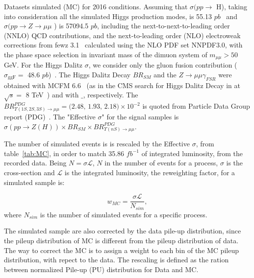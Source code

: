 \begin{table}[htp]
\begin{center}
\caption{Datasets simulated (MC) for 2016 conditions. Assuming that $\sigma (pp\rightarrow$ H), taking into consideration all the simulated Higgs production modes, is 55.13 $pb$~\cite{CERNYellowReportPageAt13TeV} and  $\sigma (pp\rightarrow Z \rightarrow \mu\mu$ ) is 57094.5 $pb$, including the next-to-next-to-leading order
(NNLO) QCD contributions, and the next-to-leading order (NLO) electroweak corrections from fewz 3.1~\cite{FEWZ} calculated using the NLO PDF set NNPDF3.0, with the phase space selection in invariant mass of the dimuon system of $m_{\mu\mu} > 50$ GeV. For the Higgs Dalitz $\sigma$, we consider only the gluon fusion contribution ($\sigma_{\text{ggF}}  = $ 48.6 $pb$)~\cite{CERNYellowReportPageAt13TeV}. The Higgs Dalitz Decay $BR_{SM}$ and the $Z \rightarrow \mu\mu\gamma_{FSR}$ were obtained with MCFM 6.6~\cite{CAMPBELL201010} (as in the CMS search for Higgs Dalitz Decay in at $\sqrt{s} =$ 8 TeV~\cite{dalitz_decay_8_Tev}) and with  $\_$\MCATNLO, respectively. The $BR^{PDG}_{\Upsilon(1S,2S,3S) \rightarrow \mu\mu} = \text{(2.48, 1.93, 2.18)} \times 10^{-2}$ is quoted from Particle Data Group report (PDG)~\cite{pdg_2020}. The "Effective $\sigma$" for the signal samples is $\sigma(pp \rightarrow Z(H)) \times BR_{SM} \times BR^{PDG}_{\Upsilon(nS) \rightarrow \mu\mu}$.}

\label{tab:MC}
\end{center}
\end{table}

The number of simulated events is is rescaled by the Effective $\sigma$, from table~\ref{tab:MC}, in order to match 35.86 $fb^{-1}$ of integrated luminosity, from the recorded data. Being $N = \sigma \mathcal{L}$, $N$ in the number of events for a process, $\sigma$ is the cross-section and $\mathcal{L}$ is the integrated luminosity, the reweighting factor, for a simulated sample is:

\begin{equation}
\label{eqn:mc_weight}
w_{MC} = \frac{\sigma \mathcal{L}}{N_{sim}},
\end{equation}
where $N_{sim}$ is the number of simulated events for a specific process.

The simulated sample are also corrected by the data pile-up distribution, since the pileup distribution of MC is different from the pileup distribution of data. The way to correct the MC is to assign a weight to each bin of the MC pileup distribution, with repect to the data. The rescaling is defined as the ration between normalized Pile-up (PU) distribution for Data and MC.

